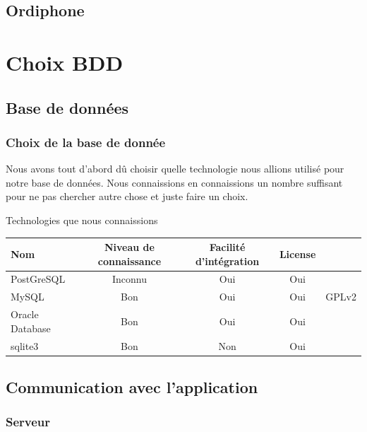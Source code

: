 \documentclass[a4paper, 11pt]{report}
\begin{document}
\section{Ordiphone}
	
\chapter{Choix BDD}
\section{Base de données}
\subsection{Choix de la base de donnée}
	Nous avons tout d'abord dû choisir quelle technologie nous allions utilisé pour notre base de données.
	Nous connaissions en connaissions un nombre suffisant pour ne pas chercher autre chose et juste faire un choix.
	\par
	\begin{center}
		Technologies que nous connaissions
		\par
		\begin{tabular}{|l|c|c|c|c|}
			\hline
			Nom & Niveau de connaissance & Facilité d'intégration & License \\
			\hline
			PostGreSQL & Inconnu & Oui & Oui\\
			\hline
			MySQL & Bon & Oui & Oui & GPLv2\\
			\hline
			Oracle Database & Bon & Oui & Oui \\
			\hline
			sqlite3 & Bon & Non & Oui \\
			\hline
		\end{tabular}
	\end{center}
\section{Communication avec l'application}
\subsection{Serveur}
\end{document}

